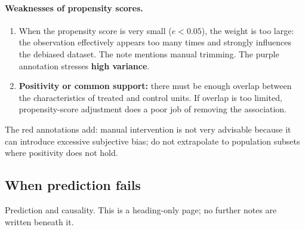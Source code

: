 \paragraph{Weaknesses of propensity scores.}
\begin{enumerate}
\item When the propensity score is very small (\(e<0.05\)), the weight is too large: the observation effectively appears too many times and strongly influences the debiased dataset. The note mentions manual trimming. The purple annotation stresses \textbf{high variance}.
\item \textbf{Positivity or common support:} there must be enough overlap between the characteristics of treated and control units. If overlap is too limited, propensity-score adjustment does a poor job of removing the association.
\end{enumerate}
The red annotations add: manual intervention is not very advisable because it can introduce excessive subjective bias; do not extrapolate to population subsets where positivity does not hold.

\subsection{When prediction fails}
Prediction and causality. This is a heading-only page; no further notes are written beneath it.
